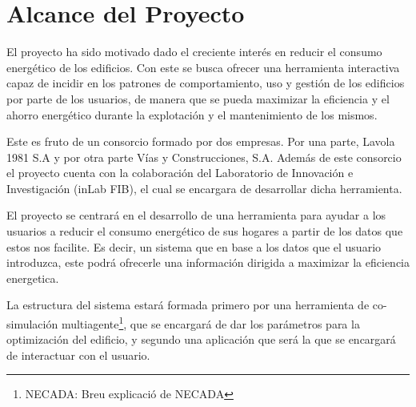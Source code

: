 \section{Alcance del Proyecto}

El proyecto ha sido motivado dado el creciente interés en reducir el consumo energético de los edificios. Con este se busca ofrecer una herramienta interactiva capaz de incidir en los patrones de comportamiento, uso y gestión de los edificios por parte de los usuarios, de manera que se pueda maximizar la eficiencia y el ahorro energético durante la explotación y el mantenimiento de los mismos.

Este es fruto de un consorcio formado por dos empresas. Por una parte, Lavola 1981 S.A y por otra parte Vías y Construcciones, S.A. Además de este consorcio el proyecto cuenta con la colaboración del Laboratorio de Innovación e Investigación (inLab FIB), el cual se encargara de desarrollar dicha herramienta.

El proyecto se centrará en el desarrollo de una herramienta para ayudar a los usuarios a reducir el consumo energético de sus hogares a partir de los datos que estos nos facilite. Es decir, un sistema que en base a los datos que el usuario introduzca, este podrá ofrecerle una información dirigida a maximizar la eficiencia energetica.

La estructura del sistema estará formada primero por una herramienta de co-simulación multiagente\footnote{NECADA: Breu explicació de NECADA}, que se encargará de dar los parámetros para la optimización del edificio, y segundo una aplicación que será la que se encargará de interactuar con el usuario. 

